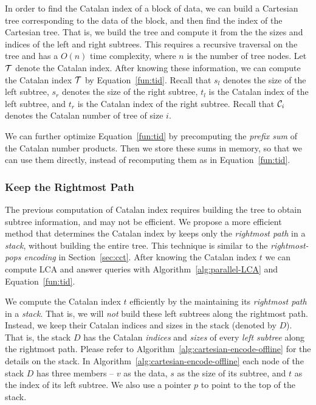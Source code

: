 In order to find the Catalan index of a block of data, we can build a
Cartesian tree corresponding to the data of the block, and then find the
index of the Cartesian tree.  That is, we build the tree and compute it
from the the sizes and indices of the left and right subtrees.  This
requires a recursive traversal on the tree and has a $O(n)$ time
complexity, where $n$ is the number of tree nodes.  Let ${\cal T}$
denote the Catalan index.  After knowing these information, we can
compute the Catalan index ${\cal T}$ by Equation~\ref{fun:tid}.  Recall
that $s_l$ denotes the size of the left subtree, $s_r$ denotes the size
of the right subtree, $t_l$ is the Catalan index of the left subtree,
and $t_r$ is the Catalan index of the right subtree.  Recall that ${\cal
C}_i$ denotes the Catalan number of tree of size $i$.

% 



We can further optimize Equation~\ref{fun:tid} by precomputing the
{\em prefix sum} of the Catalan number products.  Then we store these
sums in memory, so that we can use them directly, instead of
recomputing them as in Equation~\ref{fun:tid}.  


\subsubsection{Keep the Rightmost Path}

The previous computation of Catalan index requires building the tree
to obtain subtree information, and may not be efficient.  We propose a
more efficient method that determines the Catalan index by keeps only
the {\em rightmost path} in a {\em stack}, without building the entire
tree.  This technique is similar to the {\em rightmost-pops encoding}
in Section~\ref{sec:cct}.  After knowing the Catalan index $t$ we can
compute LCA and answer queries with Algorithm~\ref{alg:parallel-LCA}
and Equation~\ref{fun:tid}.

We compute the Catalan index $t$ efficiently by the maintaining its {\em
rightmost path} in a {\em stack}.  That is, we will {\em not} build
these left subtrees along the rightmost path.  Instead, we keep their
Catalan indices and sizes in the stack (denoted by $D$).  That is, the
stack $D$ has the Catalan {\em indices} and {\em sizes} of every {\em
left subtree} along the rightmost path.  Please refer to
Algorithm~\ref{alg:cartesian-encode-offline} for the details on the
stack.  In Algorithm~\ref{alg:cartesian-encode-offline} each node of the
stack $D$ has three members -- $v$ as the data, $s$ as the size of its
subtree, and $t$ as the index of its left subtree.  We also use a
pointer $p$ to point to the top of the stack.


